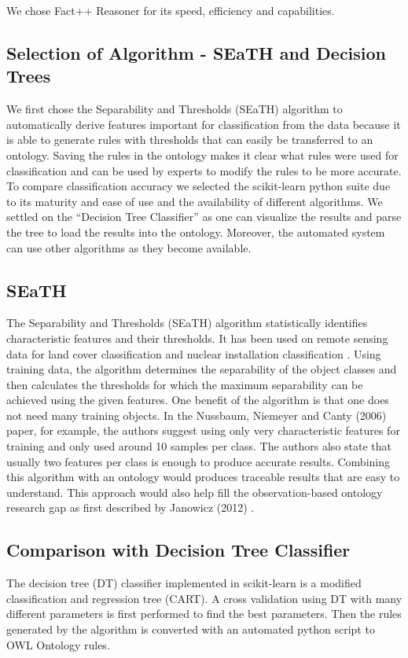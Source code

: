 \documentclass[authoryear, review,12pt,number]{elsarticle}
\begin{document}
We chose Fact++ Reasoner for its speed, efficiency and
capabilities.

\subsection{Selection of Algorithm - SEaTH and Decision Trees}
We first chose the Separability and Thresholds
(SEaTH) \citep{Nussbaum2006} algorithm to automatically derive features important
for classification from the data because it is able to generate rules with
thresholds that can easily be transferred to an ontology. Saving the rules in
the ontology makes it clear what rules were used for classification and can be
used by experts to modify the rules to be more accurate. To compare
classification accuracy we selected the scikit-learn python suite
\citep{scikit-learn} due to its maturity and ease of use and the availability of
different algorithms. We settled on the ``Decision Tree Classifier'' as one can
visualize the results and parse the tree to load the results into the ontology.
Moreover, the automated system can use other algorithms as they become available.
\subsection{SEaTH} The Separability and Thresholds (SEaTH) algorithm
\citep{Nussbaum2006} statistically identifies characteristic features and their thresholds. It has
been used on remote sensing data for land cover classification \citep{Gao2011}
and nuclear installation classification \citep{Nussbaum2006}.
Using training data, the algorithm determines the separability of the object
classes and then calculates the thresholds for which the maximum separability
can be achieved using the given features. One benefit of the algorithm is that
one does not need many training objects.
In the Nussbaum, Niemeyer and Canty (2006) paper, for example, the authors
suggest using only very characteristic features for training and only used
around 10 samples per class\citep{Nussbaum2006}. The authors also state that
usually two features per class is enough to produce accurate results. Combining
this algorithm with an ontology would produces traceable results that are easy
to understand. This approach would also help fill the observation-based ontology
research gap as first described by Janowicz (2012) \citep{Janowicz2012}.

\subsection{Comparison with Decision Tree Classifier}
The decision tree (DT) classifier implemented in scikit-learn is a modified
classification and regression tree (CART)\citep{scikit-learn}. A cross
validation using DT with many different parameters is first performed to find the best
parameters. Then the rules generated by the algorithm is converted with an
automated python script to OWL Ontology rules.
\end{document}
